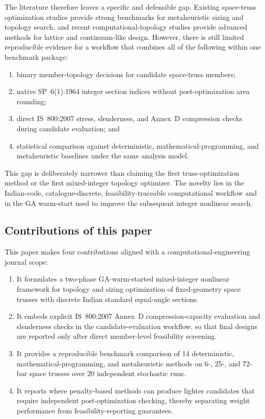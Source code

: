 \documentclass[lineno,pdflatex,sn-mathphys-num]{sn-jnl}
\begin{document}
The literature therefore leaves a specific and defensible gap. Existing
space-truss optimization studies provide strong benchmarks for metaheuristic
sizing and topology search, and recent computational-topology studies provide
advanced methods for lattice and continuum-like design. However, there is still
limited reproducible evidence for a workflow that combines all of the following
within one benchmark package:
\begin{enumerate}
  \item binary member-topology decisions for candidate space-truss members;
  \item native SP~6(1):1964 integer section indices without post-optimization
        area rounding;
  \item direct IS~800:2007 stress, slenderness, and Annex~D compression checks
        during candidate evaluation; and
  \item statistical comparison against deterministic, mathematical-programming,
        and metaheuristic baselines under the same analysis model.
\end{enumerate}
This gap is deliberately narrower than claiming the first truss-optimization
method or the first mixed-integer topology optimizer. The novelty lies in the
Indian-code, catalogue-discrete, feasibility-traceable computational workflow
and in the GA warm-start used to improve the subsequent integer nonlinear
search.

\subsection{Contributions of this paper}

This paper makes four contributions aligned with a computational-engineering
journal scope:
\begin{enumerate}
  \item It formulates a two-phase GA-warm-started mixed-integer nonlinear
        framework for topology and sizing optimization of fixed-geometry space
        trusses with discrete Indian standard equal-angle sections.
  \item It embeds explicit IS~800:2007 Annex~D compression-capacity evaluation
        and slenderness checks in the candidate-evaluation workflow, so that
        final designs are reported only after direct member-level feasibility
        screening.
  \item It provides a reproducible benchmark comparison of 14 deterministic,
        mathematical-programming, and metaheuristic methods on 6-, 25-, and
        72-bar space trusses over 20 independent stochastic runs.
  \item It reports where penalty-based methods can produce lighter candidates
        that require independent post-optimization checking, thereby separating
        weight performance from feasibility-reporting guarantees.
\end{enumerate}
\end{document}
